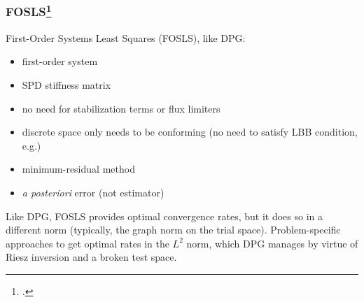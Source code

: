 \documentclass[mathserif]{beamer}
\newcommand{\pecosbold}[1]{{\color{pecos2}{#1}}}
\newcommand{\FootSize}{\scriptsize}
\begin{document}
\begin{frame}
\frametitle{}
\begin{block}{}
 \\
\\
\end{block}
\end{frame}


{\scriptsize

}

\addtocounter{framenumber}{-1} %
\begin{frame}
\frametitle{FOSLS\footnote{\FootSize {}.}}\nocite{FOSLS2}
First-Order Systems Least Squares (FOSLS), like DPG:
\begin{itemize}
\item first-order system
\item SPD stiffness matrix
\item no need for stabilization terms or flux limiters
\item discrete space only needs to be conforming (no need to satisfy LBB condition, e.g.)
\item minimum-residual method
\item \emph{a posteriori} error \pecosbold{measure} (not estimator)
\end{itemize}
Like DPG, FOSLS provides optimal convergence rates, but it does so in a different norm (typically, the graph norm on the trial space).  Problem-specific approaches to get optimal rates in the $L^{2}$ norm, which DPG manages by virtue of Riesz inversion and a broken test space.
\end{frame}
\end{document}
